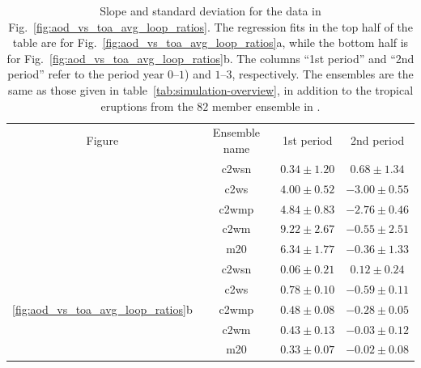 \documentclass{ametsocV6.1}
\begin{document}
\begin{table}
  \centering

  \caption{Slope and standard deviation for the data in
    Fig.~\ref{fig:aod_vs_toa_avg_loop_ratios}. The regression fits in the top half of the
    table are for Fig.~\ref{fig:aod_vs_toa_avg_loop_ratios}a, while the bottom half is for
    Fig.~\ref{fig:aod_vs_toa_avg_loop_ratios}b. The columns ``1st period'' and ``2nd
    period'' refer to the period year \(0\)--\(1\)) and \(1\)--\(3\), respectively. The
    ensembles are the same as those given in table~\ref{tab:simulation-overview}, in
    addition to the tropical eruptions from the \(82\) member ensemble in
    \citet{marshall2020}.}\label{tab:slope-gradients}%
  \begin{tabular}{cccc}
    Figure                                                  & Ensemble name & 1st period      & 2nd period       \\
    \rowcolor{LightGray}                                    & \gls{c2wsn}   & \(0.34\pm1.20\) & \(0.68\pm1.34\)  \\
    \rowcolor{LightGray}                                    & \gls{c2ws}    & \(4.00\pm0.52\) & \(-3.00\pm0.55\) \\
    \rowcolor{LightGray}                                    & \gls{c2wmp}   & \(4.84\pm0.83\) & \(-2.76\pm0.46\) \\
    \rowcolor{LightGray}                                    & \gls{c2wm}    & \(9.22\pm2.67\) & \(-0.55\pm2.51\) \\
    \rowcolor{LightGray}                                    & \gls{m20}     & \(6.34\pm1.77\) & \(-0.36\pm1.33\) \\
    \multirow{5}{*}{\ref{fig:aod_vs_toa_avg_loop_ratios}b}  & \gls{c2wsn}   & \(0.06\pm0.21\) & \(0.12\pm0.24\)  \\
    \multirow{-9}{*}{\ref{fig:aod_vs_toa_avg_loop_ratios}a} & \gls{c2ws}    & \(0.78\pm0.10\) & \(-0.59\pm0.11\) \\
                                                            & \gls{c2wmp}   & \(0.48\pm0.08\) & \(-0.28\pm0.05\) \\
                                                            & \gls{c2wm}    & \(0.43\pm0.13\) & \(-0.03\pm0.12\) \\
                                                            & \gls{m20}     & \(0.33\pm0.07\) & \(-0.02\pm0.08\) \\
  \end{tabular}
\end{table}
\end{document}
